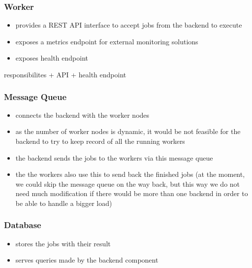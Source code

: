\subsubsection{Worker}

\begin{itemize}
	\item provides a REST API interface to accept jobs from the backend to execute
	\item exposes a metrics endpoint for external monitoring solutions
	\item exposes health endpoint
\end{itemize}

responsibilites + API + health endpoint

\subsubsection{Message Queue}

\begin{itemize}
	\item connects the backend with the worker nodes
	\item as the number of worker nodes is dynamic, it would be not feasible for the backend to try to keep record of all the running workers
	\item the backend sends the jobs to the workers via this message queue
	\item the the workers also use this to send back the finished jobs (at the moment, we could skip the message queue on the way back, but this way we do not need much modification if there would be more than one backend in order to \eg be able to handle a bigger load)
\end{itemize}

\subsubsection{Database}

\begin{itemize}
	\item stores the jobs with their result 
	\item serves queries made by the backend component
\end{itemize}

